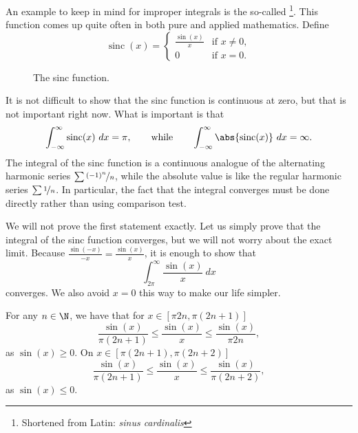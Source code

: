 \documentclass[12pt]{book}
\begin{document}
\begin{example}
An example to keep in mind for improper integrals
is the so-called \emph{}%
\footnote{Shortened from Latin: \emph{sinus cardinalis}}.
This function comes up quite often
in both pure and applied mathematics.
Define
\begin{equation*}
\operatorname{sinc}(x) =
\begin{cases}
\frac{\sin(x)}{x} & \text{if $x \not= 0$} , \\
0 & \text{if $x = 0$} .
\end{cases}
\end{equation*}
\begin{figure}[h!t]
\begin{center}

\caption{The sinc function.
\label{figsinc}}
\end{center}
\end{figure}

It is not difficult to show that
the sinc function is continuous at zero, but that is
not important right now.
What is important is that
\begin{equation*}
\int_{-\infty}^\infty \operatorname{sinc}(x) ~dx = \pi ,
\qquad \text{while} \qquad
\int_{-\infty}^\infty \abs{\operatorname{sinc}(x)} ~dx = \infty .
\end{equation*}
The integral of the sinc function is a continuous analogue of the
alternating harmonic series $\sum \nicefrac{{(-1)}^n}{n}$, while the
absolute value is like the regular harmonic series $\sum \nicefrac{1}{n}$.
In particular, the fact that the integral converges must be done directly
rather than using comparison test.

We will not prove the first statement exactly.
Let us simply prove
that the integral of the sinc function converges, but we will not worry
about the exact limit.
Because $\frac{\sin(-x)}{-x} = \frac{\sin(x)}{x}$, it is
enough to show that
\begin{equation*}
\int_{2\pi}^\infty \frac{\sin(x)}{x}~dx
\end{equation*}
converges.
We
also avoid $x=0$ this way to make our life simpler.

For any $n \in \N$, we have that for $x \in [\pi 2n, \pi (2n+1)]$
\begin{equation*}
\frac{\sin(x)}{\pi (2n+1)}
\leq
\frac{\sin(x)}{x}
\leq
\frac{\sin(x)}{\pi 2n} ,
\end{equation*}
as $\sin(x) \geq 0$.
On $x \in [\pi (2n+1), \pi (2n+2)]$
\begin{equation*}
\frac{\sin(x)}{\pi (2n+1)}
\leq
\frac{\sin(x)}{x}
\leq
\frac{\sin(x)}{\pi (2n+2)} ,
\end{equation*}
as $\sin(x) \leq 0$.


\end{example}
\end{document}
